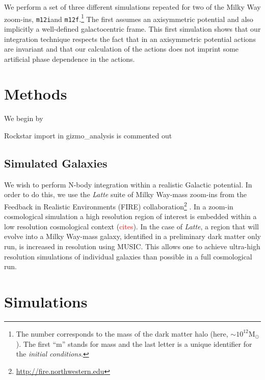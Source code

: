 \documentclass[twocolumn]{aastex62}
\newcommand{\Gus}[1]{\textcolor{red}{#1}}
\newcommand{\Msun}{\text{M}_\odot}
\newcommand{\mi}{\texttt{m12i}}
\newcommand{\mf}{\texttt{m12f}}
\begin{document}
We perform a set of three different simulations repeated for two of the Milky Way zoom-ins, \mi and \mf.\footnote{The number corresponds to the mass of the dark matter halo (here, $\sim 10^{12} \Msun$). The first ``m'' stands for mass and the last letter is a unique identifier for the {\em initial conditions}.} The first assumes an axisymmetric potential and also implicitly a well-defined galactocentric frame. This first simulation shows that our integration technique respects the fact that in an axisymmetric potential actions are invariant and that our calculation of the actions does not imprint some artificial phase dependence in the actions.


\section{Methods} \label{sec:methods}
We begin by 

Rockstar import in gizmo_analysis is commented out

\subsection{Simulated Galaxies} \label{ssec:fire}
We wish to perform N-body integration within a realistic Galactic potential. In order to do this, we use the {\em Latte} suite of Milky Way-mass zoom-ins from the Feedback in Realistic Environments (FIRE) collaboration\footnote{\url{http://fire.northwestern.edu}} \citep{2016ApJ...827L..23W,2018MNRAS.480..800H}. In a zoom-in cosmological simulation a high resolution region of interest is embedded within a low resolution cosmological context (\Gus{cites}). In the case of {\em Latte}, a region that will evolve into a Milky Way-mass galaxy, identified in a preliminary dark matter only run, is increased in resolution using MUSIC. This allows one to achieve ultra-high resolution simulations of individual galaxies than possible in a full cosmological run.



\section{Simulations}


\end{document}
